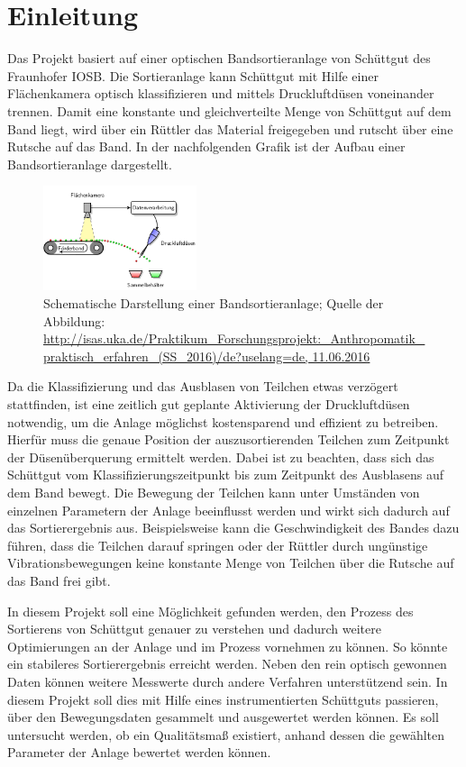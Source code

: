 \section{Einleitung}

Das Projekt basiert auf einer optischen Bandsortieranlage von Schüttgut des Fraunhofer IOSB. Die Sortieranlage kann Schüttgut mit Hilfe einer Flächenkamera optisch klassifizieren und mittels Druckluftdüsen voneinander trennen. Damit eine konstante und gleichverteilte Menge von Schüttgut auf dem Band liegt, wird über ein Rüttler das Material freigegeben und rutscht über eine Rutsche auf das Band. In der nachfolgenden Grafik ist der Aufbau einer Bandsortieranlage dargestellt.

\begin{figure}[ht]
  \centering
  \includegraphics[width=0.4\textwidth]{images/k1-tracksort.png}
  \caption {Schematische Darstellung einer Bandsortieranlage; Quelle der Abbildung: \url{http://isas.uka.de/Praktikum\_Forschungsprojekt:\_Anthropomatik\_praktisch\_erfahren\_(SS\_2016)/de?uselang=de, 11.06.2016} }
 \label{fig:k1}
\end{figure}


Da die Klassifizierung und das Ausblasen von Teilchen etwas verzögert stattfinden, ist eine zeitlich gut geplante Aktivierung der Druckluftdüsen notwendig, um die Anlage möglichst kostensparend und effizient zu betreiben. Hierfür muss die genaue Position der auszusortierenden Teilchen zum Zeitpunkt der Düsenüberquerung ermittelt werden. Dabei ist zu beachten, dass sich das Schüttgut vom Klassifizierungszeitpunkt bis zum Zeitpunkt des Ausblasens auf dem Band bewegt. Die Bewegung der Teilchen kann unter Umständen von einzelnen Parametern der Anlage beeinflusst werden und wirkt sich dadurch auf das Sortierergebnis aus. Beispielsweise kann die Geschwindigkeit des Bandes dazu führen, dass die Teilchen darauf springen oder der Rüttler durch ungünstige Vibrationsbewegungen keine konstante Menge von Teilchen über die Rutsche auf das Band frei gibt. 

In diesem Projekt soll eine Möglichkeit gefunden werden, den Prozess des Sortierens von Schüttgut genauer zu verstehen und dadurch weitere Optimierungen an der Anlage und im Prozess vornehmen zu können. So könnte ein stabileres Sortierergebnis erreicht werden. Neben den rein optisch gewonnen Daten können weitere Messwerte durch andere Verfahren unterstützend sein. In diesem Projekt soll dies mit Hilfe eines instrumentierten Schüttguts passieren, über den Bewegungsdaten gesammelt und ausgewertet werden können. Es soll untersucht werden, ob ein Qualitätsmaß existiert, anhand dessen die gewählten Parameter der Anlage bewertet werden können.

